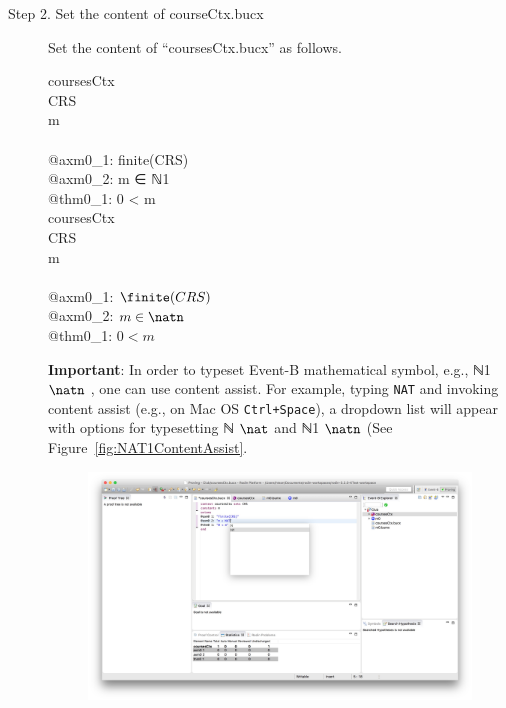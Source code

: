 \begin{description}
\item[Step 2. Set the content of courseCtx.bucx] Set the content of ``coursesCtx.bucx'' as follows.
  \begin{center}
    \begin{Bcode}
      \ifplastex
      \Bcontext{} coursesCtx\\
      \Bsets{} CRS\\
      \Bconstants{} m\\
      \Baxioms\\
      @axm0_1: finite(CRS)\\
      @axm0_2: m ∈ ℕ1\\
      \Btheorem{} @thm0_1: 0 < m \\
      \Bend
      \else
\Bcontext{} coursesCtx\\
\Bsets{} CRS\\
\Bconstants{} m\\
\Baxioms\\
\Btab @axm0\_1: \(\finite(CRS)\)\\
\Btab @axm0\_2: \(m \in \natn\)\\
\Btab \Btheorem{} @thm0\_1: \(0 < m\)\\
\Bend
       \fi
    \end{Bcode}
  \end{center}
  \textbf{Important}: In order to typeset Event-B mathematical symbol, e.g., \ifplastex ℕ1 \else $\natn$ \fi, one can use content assist. For example, typing \texttt{NAT} and invoking content assist (e.g., on Mac OS \texttt{Ctrl+Space}), a dropdown list will appear with options for typesetting \ifplastex ℕ \else $\nat$ \fi and \ifplastex ℕ1 \else $\natn$ \fi (See Figure~\ref{fig:NAT1ContentAssist}.
  \begin{figure}[!htbp]
    \centering
    \ifplastex
    \includegraphics[width=512]{figures/NAT1ContentAssist}

\end{figure}
\end{description}
